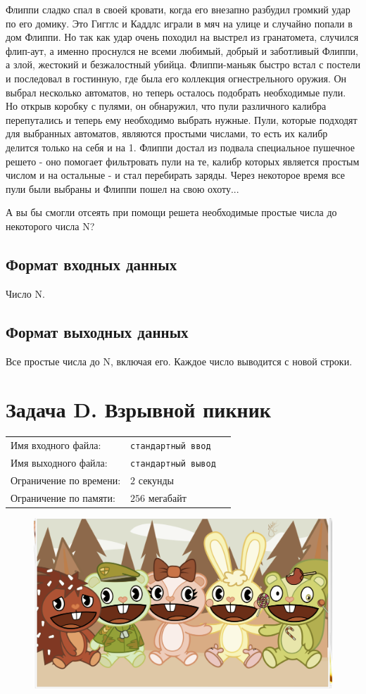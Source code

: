 \documentclass[12pt]{scrartcl}
\newcommand{\inputFile}{стандартный ввод}
\newcommand{\outputFile}{стандартный вывод}
\begin{document}
Флиппи сладко спал в своей кровати, когда его внезапно разбудил громкий удар по его домику. Это Гигглс и Каддлс играли в мяч на улице и случайно попали в дом Флиппи. Но так как удар очень 
походил на выстрел из гранатомета, случился флип-аут, а именно проснулся не всеми любимый, добрый и заботливый Флиппи, а злой, жестокий и безжалостный убийца. 
Флиппи-маньяк быстро встал с постели и последовал в гостинную, где была его коллекция огнестрельного оружия. Он выбрал несколько автоматов, но теперь осталось подобрать необходимые пули.
Но открыв коробку с пулями, он обнаружил, что пули различного калибра перепутались и теперь ему необходимо выбрать нужные. Пули, которые подходят для выбранных автоматов, являются простыми числами, то есть их калибр делится только на себя и на 1.
Флиппи достал из подвала специальное пушечное решето - оно помогает фильтровать пули на те, калибр которых является простым числом и на остальные - и стал перебирать заряды.
Через некоторое время все пули были выбраны и Флиппи пошел на свою охоту...

А вы бы смогли отсеять при помощи решета необходимые простые числа до некоторого числа N?

\subsection*{Формат входных данных}
Число N.
\subsection*{Формат выходных данных}
Все простые числа до N, включая его. Каждое число выводится с новой строки.

\newpage


\section*{Задача D. Взрывной пикник}

\begin{tabularx}{\textwidth}{l l X}
    Имя входного файла: & \texttt{\inputFile} \\
    Имя выходного файла: & \texttt{\outputFile} \\
    Ограничение по времени: & $2$ секунды \\
    Ограничение по памяти: & $256$ мегабайт \\
\end{tabularx}

\begin{figure}[h]
	\centering
    \includegraphics[width=0.5\linewidth]{happy.png}
\end{figure}
\end{document}
